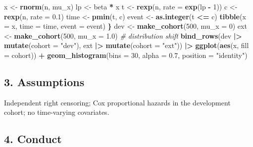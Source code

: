 \documentclass[
]{article}
\newenvironment{Shaded}{\begin{snugshade}}{\end{snugshade}}
\newcommand{\AttributeTok}[1]{\textcolor[rgb]{0.13,0.29,0.53}{#1}}
\newcommand{\CommentTok}[1]{\textcolor[rgb]{0.56,0.35,0.01}{\textit{#1}}}
\newcommand{\DecValTok}[1]{\textcolor[rgb]{0.00,0.00,0.81}{#1}}
\newcommand{\ErrorTok}[1]{\textcolor[rgb]{0.64,0.00,0.00}{\textbf{#1}}}
\newcommand{\FloatTok}[1]{\textcolor[rgb]{0.00,0.00,0.81}{#1}}
\newcommand{\FunctionTok}[1]{\textcolor[rgb]{0.13,0.29,0.53}{\textbf{#1}}}
\newcommand{\NormalTok}[1]{#1}
\newcommand{\OtherTok}[1]{\textcolor[rgb]{0.56,0.35,0.01}{#1}}
\newcommand{\SpecialCharTok}[1]{\textcolor[rgb]{0.81,0.36,0.00}{\textbf{#1}}}
\newcommand{\StringTok}[1]{\textcolor[rgb]{0.31,0.60,0.02}{#1}}
\begin{document}
\begin{Shaded}
\begin{Highlighting}[]
\NormalTok{  x }\OtherTok{\textless{}{-}} \FunctionTok{rnorm}\NormalTok{(n, mu\_x)}
\NormalTok{  lp }\OtherTok{\textless{}{-}}\NormalTok{ beta }\SpecialCharTok{*}\NormalTok{ x}
\NormalTok{  t }\OtherTok{\textless{}{-}} \FunctionTok{rexp}\NormalTok{(n, }\AttributeTok{rate =} \FunctionTok{exp}\NormalTok{(lp }\SpecialCharTok{{-}} \DecValTok{1}\NormalTok{))}
\NormalTok{  c }\OtherTok{\textless{}{-}} \FunctionTok{rexp}\NormalTok{(n, }\AttributeTok{rate =} \FloatTok{0.1}\NormalTok{)}
\NormalTok{  time }\OtherTok{\textless{}{-}} \FunctionTok{pmin}\NormalTok{(t, c)}
\NormalTok{  event }\OtherTok{\textless{}{-}} \FunctionTok{as.integer}\NormalTok{(t }\SpecialCharTok{\textless{}=}\NormalTok{ c)}
  \FunctionTok{tibble}\NormalTok{(}\AttributeTok{x =}\NormalTok{ x, }\AttributeTok{time =}\NormalTok{ time, }\AttributeTok{event =}\NormalTok{ event)}
\ErrorTok{\}}
\NormalTok{dev  }\OtherTok{\textless{}{-}} \FunctionTok{make\_cohort}\NormalTok{(}\DecValTok{500}\NormalTok{, }\AttributeTok{mu\_x =} \DecValTok{0}\NormalTok{)}
\NormalTok{ext  }\OtherTok{\textless{}{-}} \FunctionTok{make\_cohort}\NormalTok{(}\DecValTok{500}\NormalTok{, }\AttributeTok{mu\_x =} \FloatTok{1.0}\NormalTok{)   }\CommentTok{\# distribution shift}
\FunctionTok{bind\_rows}\NormalTok{(dev }\SpecialCharTok{|\textgreater{}} \FunctionTok{mutate}\NormalTok{(}\AttributeTok{cohort =} \StringTok{"dev"}\NormalTok{),}
\NormalTok{          ext }\SpecialCharTok{|\textgreater{}} \FunctionTok{mutate}\NormalTok{(}\AttributeTok{cohort =} \StringTok{"ext"}\NormalTok{)) }\SpecialCharTok{|\textgreater{}}
  \FunctionTok{ggplot}\NormalTok{(}\FunctionTok{aes}\NormalTok{(x, }\AttributeTok{fill =}\NormalTok{ cohort)) }\SpecialCharTok{+}
  \FunctionTok{geom\_histogram}\NormalTok{(}\AttributeTok{bins =} \DecValTok{30}\NormalTok{, }\AttributeTok{alpha =} \FloatTok{0.7}\NormalTok{, }\AttributeTok{position =} \StringTok{"identity"}\NormalTok{)}
\end{Highlighting}
\end{Shaded}

\subsection{3. Assumptions}\label{assumptions}

Independent right censoring; Cox proportional hazards in the development
cohort; no time-varying covariates.

\subsection{4. Conduct}\label{conduct}
\end{document}
